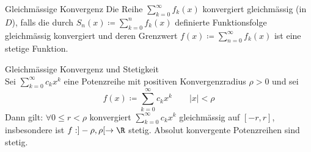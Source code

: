 
\begin{definition}{Gleichmässige Konvergenz}
    Die Reihe $\sum_{k=0}^\infty f_k(x)$ konvergiert gleichmässig (in $D$), falls die durch $S_n (x) \coloneqq \sum_{k=0}^n f_k (x)$ definierte Funktionsfolge gleichmässig konvergiert 
    und deren Grenzwert $f(x) \coloneqq \sum_{n=0}^\infty f_k(x)$
    ist eine stetige Funktion.
\end{definition}
\begin{comment}
    \begin{theorem}{Grenzwert}
    Sei $D \subseteq \R$ und $f_n : D \to \R$ eine Folge stetiger Funktionen. Wir nehmen an, dass $|f_n (x)| \leq c_n \quad \forall x \in D$ und, dass $\sum_{n=0}^\infty c_n$ konvergiert. Dann konvergiert die Reihe $\sum_{n=0}^\infty f_n (x)$ gleichmässig in $D$ und deren Grenzwert $f(x) \coloneqq \sum_{n=0}^\infty f_n(x)$
    ist eine stetige Funktion.
\end{theorem}
\end{comment}
\begin{theorem}{Gleichmässige Konvergenz und Stetigkeit}\\
    Sei $\sum_{k=0}^\infty c_k x^k$ eine Potenzreihe mit positiven Konvergenzradius $\rho > 0$ und sei 
    \begin{equation*}
        f(x) \coloneqq \sum_{k=0}^\infty c_k x^k \qquad |x| < \rho
    \end{equation*}
    Dann gilt: $\forall 0 \leq r < \rho$ konvergiert $\sum_{k=0}^\infty c_k x^k$ gleichmässig auf $[-r,r]$, insbesondere ist $f:]-\rho, \rho[ \to \R$ stetig. Absolut konvergente Potenzreihen sind stetig.
\end{theorem}

